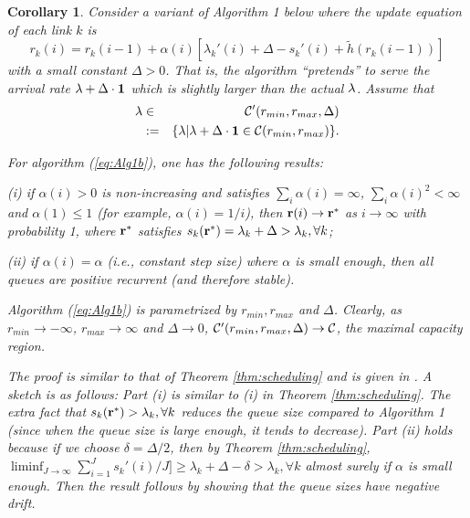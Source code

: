 \documentclass{IEEEtran}
\newtheorem{cor}{Corollary}
\begin{document}
\begin{cor}
\label{cor:stable}Consider a variant of Algorithm 1 below where the
update equation of each link $k$ is \begin{equation}
r_{k}(i)=r_{k}(i-1)+\alpha(i)[\lambda_{k}'(i)+\Delta-s_{k}'(i)+\tilde{h}(r_{k}(i-1))]\label{eq:Alg1b}\end{equation}
with a small constant $\Delta>0$. That is, the algorithm {}``pretends''
to serve the arrival rate ${\bf \lambda}+\Delta\cdot{\bf 1}$ which
is slightly larger than the actual ${\bf \lambda}$. Assume that \begin{eqnarray*}
{\bf \lambda} & \in & {\cal C}'(r_{min},r_{max},\Delta)\\
 & := & \{{\bf \lambda}|{\bf \lambda}+\Delta\cdot{\bf 1}\in{\cal C}(r_{min},r_{max})\}.\end{eqnarray*}


For algorithm (\ref{eq:Alg1b}), one has the following results:

(i) if $\alpha(i)>0$ is non-increasing and satisfies $\sum_{i}\alpha(i)=\infty$,
$\sum_{i}\alpha(i)^{2}<\infty$ and $\alpha(1)\le1$ (for example,
$\alpha(i)=1/i$), then ${\bf r}(i)\rightarrow{\bf r}^{*}$ as $i\rightarrow\infty$
with probability 1, where ${\bf r}^{*}$ satisfies $s_{k}({\bf r}^{*})=\lambda_{k}+\Delta>\lambda_{k},\forall k$;

(ii) if $\alpha(i)=\alpha$ (i.e., constant step size) where $\alpha$
is small enough, then all queues are positive recurrent (and therefore
stable). 

Algorithm (\ref{eq:Alg1b}) is parametrized by $r_{min},r_{max}$
and $\Delta$. Clearly, as $r_{min}\rightarrow-\infty$, $r_{max}\rightarrow\infty$
and $\Delta\rightarrow0$, ${\cal C}'(r_{min},r_{max},\Delta)\rightarrow{\cal C}$,
the maximal capacity region.

The proof is similar to that of Theorem \ref{thm:scheduling} and
is given in \cite{longer_version}. A sketch is as follows: Part (i)
is similar to (i) in Theorem \ref{thm:scheduling}. The extra fact
that $s_{k}({\bf r}^{*})>\lambda_{k},\forall k$ reduces the queue
size compared to Algorithm 1 (since when the queue size is large enough,
it tends to decrease). Part (ii) holds because if we choose $\delta=\Delta/2$,
then by Theorem \ref{thm:scheduling}, $\liminf_{J\rightarrow\infty}\sum_{i=1}^{J}s_{k}'(i)/J]\ge\lambda_{k}+\Delta-\delta>\lambda_{k},\forall k$
almost surely if $\alpha$ is small enough. Then the result follows
by showing that the queue sizes have negative drift. 
\end{cor}
\end{document}
